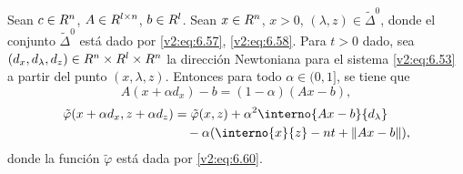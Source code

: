 \begin{proposition}\label{v2:prop:6.1.5}
    Sean $c \in R^n$, $A \in R^{l \times n}$, $b \in R^l$. Sean $x \in R^n$, $x > 0$, $(\lambda, z) \in \tilde{\Delta}^0$, donde el conjunto $\tilde{\Delta}^0$ está dado por \eqref{v2:eq:6.57}, \eqref{v2:eq:6.58}. Para $t > 0$ dado, sea $(d_x, d_\lambda, d_z) \in R^n \times R^l \times R^n$ la dirección Newtoniana para el sistema \eqref{v2:eq:6.53} a partir del punto $(x, \lambda, z)$.
    Entonces para todo $\alpha \in (0, 1]$, se tiene que
    \begin{equation}
        A(x + \alpha d_x) - b = (1 - \alpha)(Ax - b),
        \label{v2:eq:6.62}
    \end{equation}
    \begin{align}
        \tilde{\varphi}(x + \alpha d_x, z + \alpha d_z) &= \tilde{\varphi}(x, z) + \alpha^2 \interno{Ax - b}{d_\lambda} \label{v2:eq:6.63} \\
        &\quad - \alpha (\interno{x}{z} - nt + \norm{Ax - b}), \nonumber
    \end{align}
    donde la función $\tilde{\varphi}$ está dada por \eqref{v2:eq:6.60}.
\end{proposition}

